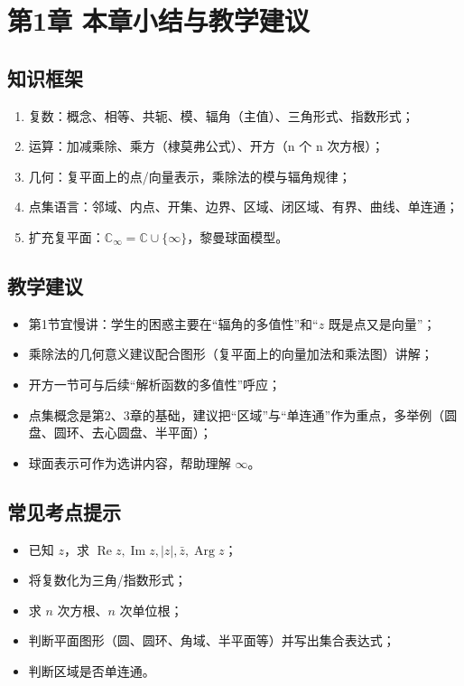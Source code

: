 \section{第1章
本章小结与教学建议}\label{ux7b2c1ux7ae0-ux672cux7ae0ux5c0fux7ed3ux4e0eux6559ux5b66ux5efaux8bae}

\subsection{知识框架}\label{ux77e5ux8bc6ux6846ux67b6}

\begin{enumerate}
\def\labelenumi{\arabic{enumi}.}
\tightlist
\item
  复数：概念、相等、共轭、模、辐角（主值）、三角形式、指数形式；
\item
  运算：加减乘除、乘方（棣莫弗公式）、开方（n 个 n 次方根）；
\item
  几何：复平面上的点/向量表示，乘除法的模与辐角规律；
\item
  点集语言：邻域、内点、开集、边界、区域、闭区域、有界、曲线、单连通；
\item
  扩充复平面：\(\mathbb{C}_\infty = \mathbb{C}\cup\{\infty\}\)，黎曼球面模型。
\end{enumerate}

\subsection{教学建议}\label{ux6559ux5b66ux5efaux8bae}

\begin{itemize}
\tightlist
\item
  第1节宜慢讲：学生的困惑主要在``辐角的多值性''和``\(z\)
  既是点又是向量''；
\item
  乘除法的几何意义建议配合图形（复平面上的向量加法和乘法图）讲解；
\item
  开方一节可与后续``解析函数的多值性''呼应；
\item
  点集概念是第2、3章的基础，建议把``区域''与``单连通''作为重点，多举例（圆盘、圆环、去心圆盘、半平面）；
\item
  球面表示可作为选讲内容，帮助理解 \(\infty\)。
\end{itemize}

\subsection{常见考点提示}\label{ux5e38ux89c1ux8003ux70b9ux63d0ux793a}

\begin{itemize}
\tightlist
\item
  已知 \(z\)，求
  \(\operatorname{Re}z,\operatorname{Im}z,|z|,\bar z,\operatorname{Arg}z\)；
\item
  将复数化为三角/指数形式；
\item
  求 \(n\) 次方根、\(n\) 次单位根；
\item
  判断平面图形（圆、圆环、角域、半平面等）并写出集合表达式；
\item
  判断区域是否单连通。
\end{itemize}

\newpage
